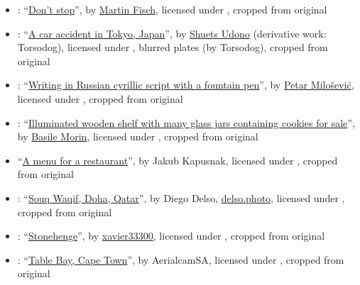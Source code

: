 \begin{itemize}
\item {}: ``\href{https://www.flickr.com/photos/marfis75/24877162894/}{Don't stop}'', by \href{https://www.flickr.com/people/marfis75/}{Martin Fisch}, licensed under , cropped from original

\item {}: ``\href{https://commons.wikimedia.org/wiki/File:Japanese_car_accident_blur.jpg}{A car accident in Tokyo, Japan}'', by \href{https://www.flickr.com/people/udono/}{Shuets Udono} (derivative work: Torsodog), licensed under , blurred plates (by Torsodog), cropped from original

\item {}: ``\href{https://commons.wikimedia.org/wiki/File:Fountain_pen_writing_(literacy).jpg}{Writing in Russian cyrillic script with a fountain pen}'', by \href{https://commons.wikimedia.org/wiki/User:PetarM}{Petar Milošević}, licensed under , cropped from original

\item {}: ``\href{https://commons.wikimedia.org/wiki/File:Illuminated_wooden_shelf_with_many_glass_jars_containing_cookies_for_sale_in_Tokyo.jpg}{Illuminated wooden shelf with many glass jars containing cookies for sale}'', by \href{https://commons.wikimedia.org/wiki/User:Basile_Morin}{Basile Morin}, licensed under , cropped from original

\item {} ``\href{https://commons.wikimedia.org/wiki/File:Foodiesfeed.com_choosing-from-verde-cocina-menu.jpg}{A menu for a restaurant}'', by Jakub Kapusnak, licensed under , cropped from original

\item {}: ``\href{https://commons.wikimedia.org/wiki/File:Souq_Waqif,_Doha,_Catar,_2013-08-05,_DD_11.jpg}{Souq Waqif, Doha, Qatar}'', by Diego Delso, \href{http://delso.photo/}{delso.photo}, licensed under , cropped from original

\item {}: ``\href{https://www.flickr.com/photos/xavier33300/14884844251/}{Stonehenge}'', by \href{https://www.flickr.com/people/xavier33300/}{xavier33300}, licensed under , cropped from original

\item {}: ``\href{https://commons.wikimedia.org/wiki/File:Table_Bay,_Cape_Town.jpg}{Table Bay, Cape Town}'', by AerialcamSA, licensed under , cropped from original


\end{itemize}
